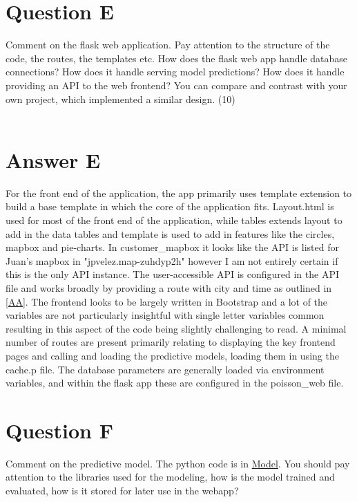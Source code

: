 \documentclass{scrreprt}
\begin{document}
\pagebreak
\section{Question E}\label{QE}
Comment on the flask web application. Pay attention to the structure of the code, the routes, the templates etc. How does the flask web app handle database connections? How does it handle serving model predictions? How does it handle providing an API to the web frontend? You can compare and contrast with your own project, which implemented a similar design. (10)\\
\\

\section{Answer E}\label{AE}
For the front end of the application, the app primarily uses template extension to build a base template in which the core of the application fits. Layout.html is used for most of the front end of the application, while tables extends layout to add in the data tables and template is used to add in features like the circles, mapbox and pie-charts. In customer\_mapbox it looks like the API is listed for Juan's mapbox in "jpvelez.map-zuhdyp2h" however I am not entirely certain if this is the only API instance. The user-accessible API is configured in the API file and works broadly by providing a route with city and time as outlined in \ref{AA}.  The frontend looks to be largely written in Bootstrap and a lot of the variables are not particularly insightful with single letter variables common resulting in this aspect of the code being slightly challenging to read. A minimal number of routes are present primarily relating to displaying the key frontend pages and calling and loading the predictive models, loading them in using the cache.p file. The database parameters are generally loaded via environment variables, and within the flask app these are configured in the poisson\_web file.

\pagebreak
\section{Question F}\label{QF}
Comment on the predictive model. The python code is in \href{https://github.com/bikeshare/model/poisson_model}{Model}. You should pay attention to the libraries used for the modeling, how is the model trained and evaluated, how is it stored for later use in the webapp?
\end{document}
